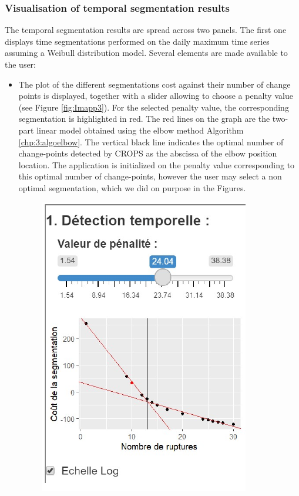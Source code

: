 \subsubsection{Visualisation of temporal segmentation results}\label{chp:6:2:temp}

 
The temporal segmentation results are spread across two panels. The first one displays time segmentations performed on the daily maximum time series assuming a Weibull distribution model. Several elements are made available to the user:
\begin{itemize}
\item The plot of the different segmentations cost against their number of change points is displayed, together with a slider allowing to choose a penalty value (see Figure \ref{fig:Imapp3}). For the selected penalty value, the corresponding segmentation is highlighted in red. The red lines on the graph are the two-part linear model obtained using the elbow method Algorithm \ref{chp:3:algoelbow}. The vertical black line indicates the optimal number of change-points detected by CROPS as the abscissa of the elbow position location. The application is initialized on the penalty value corresponding to this optimal number of change-points, however the user may select a non optimal segmentation, which we did on purpose in the Figures. 
\begin{figure}[htbp]
  \centering
  \includegraphics[]{figs/Chap6/Im_appbis3.pdf}

\end{figure}
\end{itemize}
